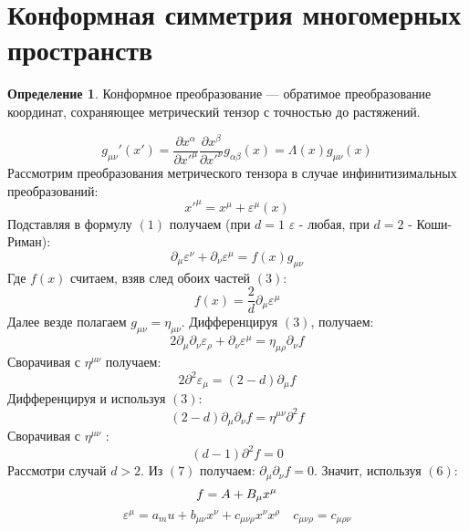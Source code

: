 \documentclass[12pt]{article}
\theoremstyle{definition}
\newtheorem{defin}[theorem]{Определение}
\begin{document}
    
 \section{Конформная симметрия многомерных пространств}
 \begin{defin}
Конформное преобразование --- обратимое преобразование координат, сохраняющее метрический тензор с точностью до растяжений.
\end{defin}
\begin{equation}
g_{\mu\nu}'(x')= \frac{\partial x^\alpha}{\partial x'^\mu}\frac{\partial x^\beta}{\partial x'^\nu}g_{\alpha\beta}(x)=\Lambda(x)g_{\mu\nu}(x)
\end{equation}
Рассмотрим преобразования метрического тензора в случае инфинитизимальных преобразований:
\begin{equation}
x'^\mu=x^\mu+\varepsilon^\mu(x)
\end{equation}
Подставляя в формулу $(1)$ получаем (при $d=1$ $\varepsilon$ - любая, при $d=2$ - Коши-Риман):
\begin{equation}
\partial_\mu\varepsilon^\nu + \partial_\nu\varepsilon^\mu = f(x)g_{\mu\nu}
\end{equation}
Где $f(x)$ считаем, взяв след обоих частей $(3)$:
\begin{equation}
f(x)=\frac{2}{d}\partial_\mu\varepsilon^\mu
\end{equation}
Далее везде полагаем $g_{\mu\nu}= \eta_{\mu\nu}$. Дифференцируя $(3)$, получаем:
\begin{equation}
2\partial_\mu\partial_\nu\varepsilon_\rho + \partial_\nu\varepsilon^\mu = \eta_{\mu\rho}\partial_\nu f
\end{equation}
Сворачивая с $\eta^{\mu\nu}$ получаем:
\begin{equation}
2\partial^2\varepsilon_\mu=(2-d)\partial_\mu f
\end{equation}
Дифференцируя и используя $(3)$:
\begin{equation}
(2-d)\partial_\mu\partial_\nu f = \eta^{\mu\nu}\partial^2 f
\end{equation}
Сворачивая с $\eta^{\mu\nu}$ :
\begin{equation}
(d-1)\partial^2 f =0
\end{equation}
Рассмотри случай $d>2$. Из $(7)$ получаем: $\partial_\mu\partial_\nu f = 0$. Значит, используя $(6)$:
\begin{equation}
f = A + B_\mu x^\mu \\
\end{equation}
\begin{equation}
\varepsilon^\mu = a_mu + b_{\mu\nu}x^\nu+c_{\mu\nu\rho}x^\nu x^\rho \quad c_{\mu\nu\rho} = c_{\mu\rho\nu}
\end{equation}
\end{document}
